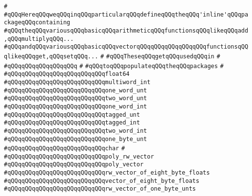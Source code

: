 \verb|#|\newline
\verb|#qQQqHereqQQqweqQQqinqQQqparticularqQQqdefineqQQqtheqQQq'inline'qQQqpackageqQQqcontaining|\newline
\verb|#qQQqtheqQQqvariousqQQqbasicqQQqarithmeticqQQqfunctionsqQQqlikeqQQqadd,qQQqmultiplyqQQq...|\newline
\verb|#qQQqandqQQqvariousqQQqbasicqQQqvectorqQQqqQQqqQQqqQQqqQQqfunctionsqQQqlikeqQQqget,qQQqsetqQQq...|\newline
\verb|#|\newline
\verb|#qQQqTheseqQQqgetqQQqusedqQQqin|\newline
\verb|#|\newline
\verb|#qQQqqQQqqQQqqQQqqQQq|\newline
\verb|#|\newline
\verb|#qQQqtoqQQqpopulateqQQqtheqQQqpackages|\newline
\verb|#|\newline
\verb|#qQQqqQQqqQQqqQQqqQQqqQQqqQQqfloat64|\newline
\verb|#qQQqqQQqqQQqqQQqqQQqqQQqqQQqmultiword_int|\newline
\verb|#qQQqqQQqqQQqqQQqqQQqqQQqqQQqone_word_unt|\newline
\verb|#qQQqqQQqqQQqqQQqqQQqqQQqqQQqtwo_word_unt|\newline
\verb|#qQQqqQQqqQQqqQQqqQQqqQQqqQQqone_word_int|\newline
\verb|#qQQqqQQqqQQqqQQqqQQqqQQqqQQqtagged_unt|\newline
\verb|#qQQqqQQqqQQqqQQqqQQqqQQqqQQqtagged_int|\newline
\verb|#qQQqqQQqqQQqqQQqqQQqqQQqqQQqtwo_word_int|\newline
\verb|#qQQqqQQqqQQqqQQqqQQqqQQqqQQqone_byte_unt|\newline
\verb|#qQQqqQQqqQQqqQQqqQQqqQQqqQQqchar|\newline
\verb|#|\newline
\verb|#qQQqqQQqqQQqqQQqqQQqqQQqqQQqpoly_rw_vector|\newline
\verb|#qQQqqQQqqQQqqQQqqQQqqQQqqQQqpoly_vector|\newline
\verb|#qQQqqQQqqQQqqQQqqQQqqQQqqQQqrw_vector_of_eight_byte_floats|\newline
\verb|#qQQqqQQqqQQqqQQqqQQqqQQqqQQqvector_of_eight_byte_floats|\newline
\verb|#qQQqqQQqqQQqqQQqqQQqqQQqqQQqrw_vector_of_one_byte_unts|\newline
